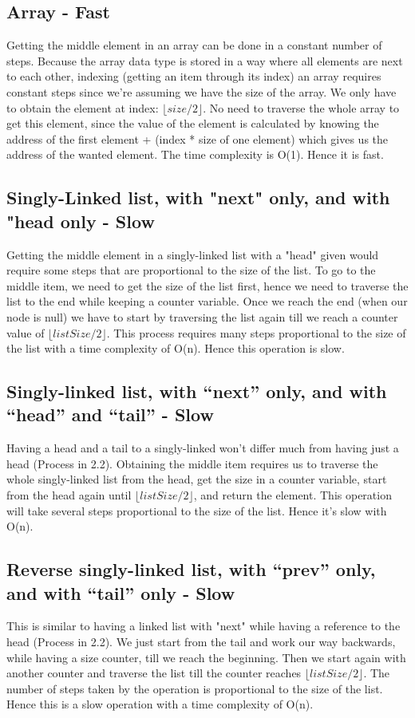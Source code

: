 \documentclass{article}
\begin{document}
\subsection{Array - Fast}
Getting the middle element in an array can be done in a constant number of steps. Because the array data type is stored in a way where all elements are next to each other, indexing (getting an item through its index) an array requires constant steps since we're assuming we have the size of the array. We only have to obtain the element at index: $\lfloor {size/2} \rfloor$. No need to traverse the whole array to get this element, since the value of the element is calculated by knowing the address of the first element + (index * size of one element) which gives us the address of the wanted element. The time complexity is O(1). Hence it is fast.

\subsection{Singly-Linked list, with "next" only, and with "head only - Slow}
Getting the middle element in a singly-linked list with a "head" given would require some steps that are proportional to the size of the list. To go to the middle item, we need to get the size of the list first, hence we need to traverse the list to the end while keeping a counter variable. Once we reach the end (when our node is null) we have to start by traversing the list again till we reach a counter value of $\lfloor {listSize/2} \rfloor$. This process requires many steps proportional to the size of the list with a time complexity of O(n). Hence this operation is slow.

\subsection{Singly-linked list, with “next” only, and with “head” and “tail” - Slow}
Having a head and a tail to a singly-linked won't differ much from having just a head (Process in 2.2). Obtaining the middle item requires us to traverse the whole singly-linked list from the head, get the size in a counter variable, start from the head again until $\lfloor {listSize/2} \rfloor$, and return the element. This operation will take several steps proportional to the size of the list. Hence it's slow with O(n).

\subsection{Reverse singly-linked list, with “prev” only, and with “tail” only - Slow}
This is similar to having a linked list with "next" while having a reference to the head (Process in 2.2). We just start from the tail and work our way backwards, while having a size counter, till we reach the beginning. Then we start again with another counter and traverse the list till the counter reaches $\lfloor {listSize/2} \rfloor$. The number of steps taken by the operation is proportional to the size of the list. Hence this is a slow operation with a time complexity of O(n).
\end{document}
